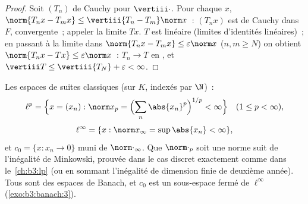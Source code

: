 \begin{proof}
Soit $(T_n)$ de Cauchy pour $\vertiii\cdot$. Pour chaque $x$,
$\norm{T_nx - T_mx} \leq \vertiii{T_n - T_m}\norm x$~:
$(T_nx)$ est de Cauchy dans $F$, convergente~; appeler la
limite $Tx$. $T$ est linéaire (limites d'identités linéaires)~;
en passant à la limite dans $\norm{T_nx - T_mx} \leq
\varepsilon\norm x$ ($n, m \geq N$) on obtient $\norm{T_nx -
Tx} \leq \varepsilon\norm x$~: $T_n \to T$ en , et $\vertiii T \leq \vertiii{T_N} + \varepsilon <
\infty$.
\end{proof}

\begin{definition}\label{def:b3:banach:lp}
Les espaces de suites classiques (sur $K$, indexés par $\N$)~:
\[
\ell^p = \Bigl\{x = (x_n) : \norm x_p = \Bigl(\sum_n
\abs{x_n}^p\Bigr)^{1/p} < \infty\Bigr\}\quad (1 \leq p <
\infty),
\]
\[
\ell^\infty = \{x : \norm x_\infty = \sup\abs{x_n} < \infty\},
\]
et $c_0 = \{x : x_n \to 0\}$ muni de $\norm\cdot_\infty$. Que
$\norm\cdot_p$ soit une norme suit de l'inégalité de Minkowski,
prouvée dans le cas discret exactement comme dans
le~\cref{ch:b3:lp} (ou en sommant l'inégalité de dimension
finie de deuxième année). Tous sont des espaces de Banach, et
$c_0$ est un sous-espace fermé de $\ell^\infty$
(\cref{exo:b3:banach:3}).
\end{definition}

